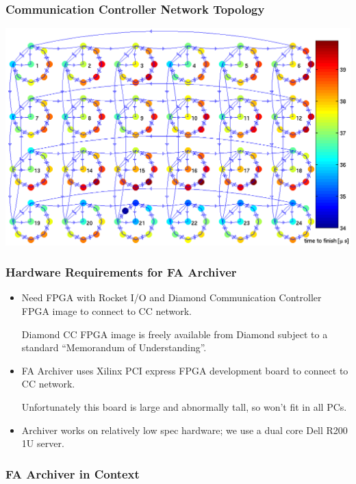 \documentclass{beamer}
\begin{document}
\begin{frame}
\frametitle{Communication Controller Network Topology}
\includegraphics[width=\linewidth]{fofb}
\end{frame}



\begin{frame}\frametitle{Hardware Requirements for FA Archiver}
\begin{itemize}

\item Need FPGA with Rocket I/O and Diamond Communication Controller FPGA image
to connect to CC network.

\vspace{2pt}
Diamond CC FPGA image is freely available from Diamond subject to a standard
``Memorandum of Understanding''.

\item FA Archiver uses Xilinx PCI express FPGA development board to connect to
CC network.

\vspace{2pt}
Unfortunately this board is large and abnormally tall, so won't fit in all PCs.

\item Archiver works on relatively low spec hardware; we use a dual core Dell
R200 1U server.


\end{itemize}

\end{frame}




\begin{frame}\frametitle{FA Archiver in Context}
\begin{center}

\end{center}
\end{frame}
\end{document}

